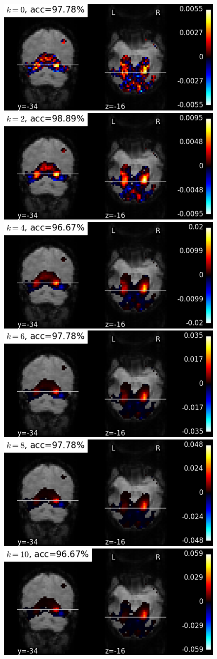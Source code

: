 \begin{figure}[!tb]
    \includegraphics[width=.5\linewidth]{figures/haxby_igraphnet_w_0_yz.png}
    \includegraphics[width=.5\linewidth]{figures/haxby_igraphnet_w_2_yz.png}
    \includegraphics[width=.5\linewidth]{figures/haxby_igraphnet_w_4_yz.png}
    \includegraphics[width=.5\linewidth]{figures/haxby_igraphnet_w_6_yz.png}
    \includegraphics[width=.5\linewidth]{figures/haxby_igraphnet_w_8_yz.png}
    \includegraphics[width=.5\linewidth]{figures/haxby_igraphnet_w_10_yz.png}

\end{figure}
